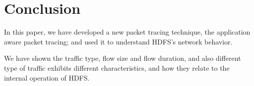\section{Conclusion}
\label{section:conclusion}

In this paper, we have developed a new packet tracing technique, the application aware packet tracing; and used it to understand HDFS's network behavior. 

We have shown the traffic type, flow size and flow duration, and also different type of traffic exhibits different characteristics, and how they relate to the internal operation of HDFS. 
